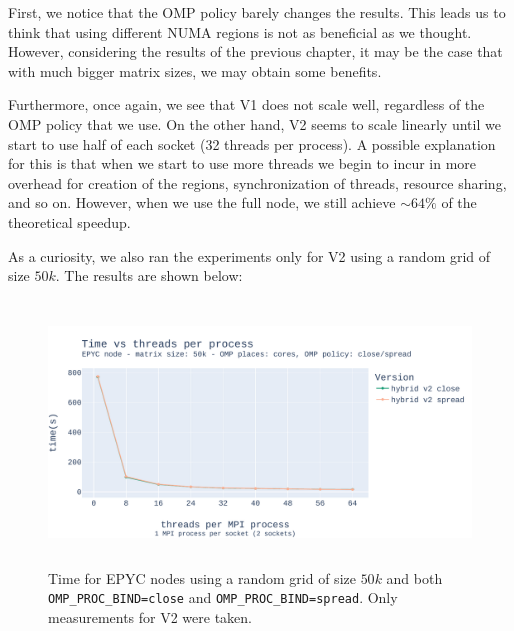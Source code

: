 \documentclass{report}
\begin{document}
First, we notice that the OMP policy barely changes the results. This leads us 
to think that using different NUMA regions is not as beneficial as we thought. 
However, considering the results of the previous chapter, it may be the case 
that with much bigger matrix sizes, we may obtain some benefits.

Furthermore, once again, we see that V1 does not scale well, regardless of the 
OMP policy that we use. On the other hand, V2 seems to scale linearly until 
we start to use half of each socket (32 threads per process). A possible 
explanation for this is that when we start to use more threads we begin to 
incur in more overhead for creation of the regions, synchronization of threads, 
resource sharing, and so on. However, when we use the full node, we still achieve $\sim 64\%$ of the 
theoretical speedup.

As a curiosity, we also ran the experiments only for V2 using a random grid 
of size $50k$. The results are shown below:

\begin{figure}[H]
\centering
\includegraphics[width=14cm, height=7cm]{./images/strong_OMP_epyc_hybrid_grid_050k.pdf}
\caption{\label{fig:strongomp10kepyc} Time for EPYC nodes using a random grid of size 
$50k$ and both \texttt{OMP\_PROC\_BIND=close} and \texttt{OMP\_PROC\_BIND=spread}. 
Only measurements for V2 were taken.}
\end{figure}
\end{document}

